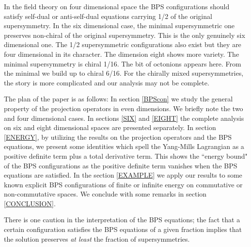 \documentclass[a4paper,11pt]{article}
\begin{document}
In the field theory on four dimensional space the BPS configurations should satisfy self-dual or anti-self-dual equations carrying 1/2 of the
original supersymmetry.  In the six dimensional case, the minimal  supersymmetric one preserves non-chiral \coordHE{} of the original supersymmetry. This
is the only genuinely six dimensional one. The 1/2 supersymmetric configurations also exist but they are four dimensional in its character. The
dimension eight shows more variety. The minimal supersymmetry is chiral 1/16. The bit of octonions appears here.  From the minimal we build up to
chiral 6/16. For the chirally mixed supersymmetries, the story is more complicated and our analysis may not be complete.





The plan of the paper is as follows: In section \ref{BPScon} we study the general property of the projection operators in even dimensions. We briefly
note the two and four dimensional cases.  In sections \ref{SIX} and \ref{EIGHT} the complete analysis on  six and eight dimensional spaces are
presented separately.   In section \ref{ENERGY}, by utilizing the results on the projection operators and the BPS equations, we present some
identities which spell the Yang-Mills Lagrangian as a positive definite term plus a total derivative term. This shows the ``energy bound" of the BPS
configurations as the positive definite term vanishes when the BPS equations are satisfied. In the section \ref{EXAMPLE} we apply our results to
some known explicit BPS configurations of finite or infinite energy on commutative or non-commutative spaces. We conclude with some remarks in
section \ref{CONCLUSION}.



There is one caution in the interpretation of the BPS equations; the fact that a certain configuration  satisfies the BPS equations of a given
fraction implies that the solution preserves {\it at least} the fraction of supersymmetries.
\newpage

\end{document}
